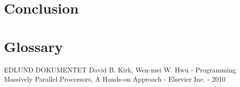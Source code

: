 \documentclass[oribibl]{llncs}
\begin{document}
	
	\label{futurework}
	
	\section{Conclusion}
	
	
	\label{conclusion}
		
	\section{Glossary}
	
	
		
	\begin{thebibliography}{9}
			 EDLUND DOKUMENTET
			 David B. Kirk, Wen-mei W. Hwu - Programming Massively Parallel Proccesors, A Hands-on Approach - Elsevier Inc. - 2010
	\end{thebibliography}
	
\end{document}

